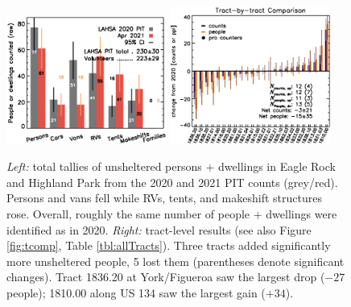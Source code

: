 \documentclass[11pt]{article}
\begin{document}

\begin{figure}[h]
	\centering
	\includegraphics[width = 0.47\textwidth, trim = 1cm 0cm 0cm 1cm]{bars}
	\includegraphics[width = 0.47\textwidth, trim = 0cm 0cm 1cm 1cm]{tractsYrYr.eps}	
	\caption{{\it Left:} total tallies of unsheltered persons + dwellings in Eagle Rock and
			Highland Park from the 2020 and 2021 PIT counts (grey/red). Persons and vans 
			fell while RVs, tents, and makeshift structures rose. Overall, roughly the same number 
			of people + dwellings were identified as in 2020. {\it Right:} tract-level
			results (see also Figure \ref{fig:tcomp}, Table \ref{tbl:allTracts}). Three tracts added 
			significantly more unsheltered people, 5 lost them (parentheses
			denote significant changes). Tract 1836.20 at York/Figueroa saw the largest 
			drop ($-27$ people); 1810.00 along US 134 saw the largest gain ($+34$).}
	\label{fig:rawCounts}
\end{figure}

\end{document}

